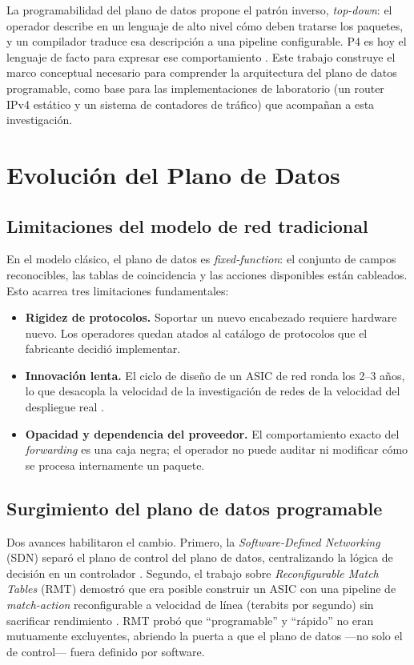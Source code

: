 \documentclass[conference,onecolumn,10pt]{IEEEtran}
\begin{document}
La programabilidad del plano de datos propone el patrón inverso, \emph{top-down}:
el operador describe en un lenguaje de alto nivel cómo deben tratarse los
paquetes, y un compilador traduce esa descripción a una pipeline configurable.
P4 es hoy el lenguaje de facto para expresar ese comportamiento
\cite{bosshart2014p4}. Este trabajo construye el marco conceptual necesario para
comprender la arquitectura del plano de datos programable, como base para las
implementaciones de laboratorio (un router IPv4 estático y un sistema de
contadores de tráfico) que acompañan a esta investigación.

\section{Evolución del Plano de Datos}

\subsection{Limitaciones del modelo de red tradicional}
En el modelo clásico, el plano de datos es \emph{fixed-function}: el conjunto de
campos reconocibles, las tablas de coincidencia y las acciones disponibles están
cableados. Esto acarrea tres limitaciones fundamentales:

\begin{itemize}
\item \textbf{Rigidez de protocolos.} Soportar un nuevo encabezado requiere
hardware nuevo. Los operadores quedan atados al catálogo de protocolos que el
fabricante decidió implementar.
\item \textbf{Innovación lenta.} El ciclo de diseño de un ASIC de red ronda los
2--3 años, lo que desacopla la velocidad de la investigación de redes de la
velocidad del despliegue real \cite{bosshart2013rmt}.
\item \textbf{Opacidad y dependencia del proveedor.} El comportamiento exacto del
\emph{forwarding} es una caja negra; el operador no puede auditar ni modificar
cómo se procesa internamente un paquete.
\end{itemize}

\subsection{Surgimiento del plano de datos programable}
Dos avances habilitaron el cambio. Primero, la \emph{Software-Defined
Networking} (SDN) separó el plano de control del plano de datos, centralizando
la lógica de decisión en un controlador \cite{mckeown2008openflow}. Segundo, el
trabajo sobre \emph{Reconfigurable Match Tables} (RMT) demostró que era posible
construir un ASIC con una pipeline de \emph{match-action} reconfigurable a
velocidad de línea (terabits por segundo) sin sacrificar rendimiento
\cite{bosshart2013rmt}. RMT probó que ``programable'' y ``rápido'' no eran
mutuamente excluyentes, abriendo la puerta a que el plano de datos —no solo el de
control— fuera definido por software.
\end{document}
